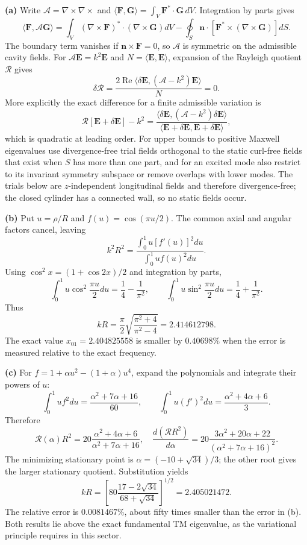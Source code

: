 \textbf{(a)} Write $\mathcal A=\nabla\times\nabla\times$ and
$\langle\mathbf F,\mathbf G\rangle=\int_V\mathbf F^*\cdot\mathbf G\,dV$.
Integration by parts gives
\[
\langle\mathbf F,\mathcal A\mathbf G\rangle
=\int_V(\nabla\times\mathbf F)^*\cdot(\nabla\times\mathbf G)dV
-\oint_S\mathbf n\cdot[\mathbf F^*\times(\nabla\times\mathbf G)]dS.
\]
The boundary term vanishes if $\mathbf n\times\mathbf F=0$,
so $\mathcal A$ is symmetric on the admissible cavity fields.
For $\mathcal A\mathbf E=k^2\mathbf E$ and
$N=\langle\mathbf E,\mathbf E\rangle$, expansion of the Rayleigh
quotient $\mathcal R$ gives
\[
\delta\mathcal R=\frac{2\operatorname{Re}
\langle\delta\mathbf E,(\mathcal A-k^2)\mathbf E\rangle}{N}=0.
\]
More explicitly the exact difference for a finite admissible variation is
\[
\mathcal R[\mathbf E+\delta\mathbf E]-k^2
=\frac{\langle\delta\mathbf E,(\mathcal A-k^2)\delta\mathbf E\rangle}
{\langle\mathbf E+\delta\mathbf E,\mathbf E+\delta\mathbf E\rangle},
\]
which is quadratic at leading order.  For upper bounds to positive
Maxwell eigenvalues use divergence-free trial fields orthogonal to
the static curl-free fields that exist when $S$ has more than one
part, and for an
excited mode also restrict to its invariant symmetry subspace or
remove overlaps with lower modes.  The trials below are
$z$-independent longitudinal fields and therefore divergence-free;
the closed cylinder has a connected wall, so no static fields occur.

\textbf{(b)} Put $u=\rho/R$ and $f(u)=\cos(\pi u/2)$.
The common axial and angular factors cancel, leaving
\[
k^2R^2=\frac{\int_0^1u[f'(u)]^2du}{\int_0^1uf(u)^2du}.
\]
Using $\cos^2x=(1+\cos2x)/2$ and integration by parts,
\[
\int_0^1u\cos^2\frac{\pi u}2du=\frac14-\frac1{\pi^2},\qquad
\int_0^1u\sin^2\frac{\pi u}2du=\frac14+\frac1{\pi^2}.
\]
Thus
\[
kR=\frac\pi2\sqrt{\frac{\pi^2+4}{\pi^2-4}}
=2.414612798.
\]
The exact value $x_{01}=2.404825558$ is smaller by $0.40698\%$
when the error is measured relative to the exact frequency.

\textbf{(c)} For $f=1+\alpha u^2-(1+\alpha)u^4$, expand the
polynomials and integrate their powers of $u$:
\[
\int_0^1uf^2du=\frac{\alpha^2+7\alpha+16}{60},\qquad
\int_0^1u(f')^2du=\frac{\alpha^2+4\alpha+6}{3}.
\]
Therefore
\[
\mathcal R(\alpha)R^2=20\frac{\alpha^2+4\alpha+6}{\alpha^2+7\alpha+16},
\quad
\frac{d(\mathcal RR^2)}{d\alpha}
=20\frac{3\alpha^2+20\alpha+22}{(\alpha^2+7\alpha+16)^2}.
\]
The minimizing stationary point is
$\alpha=(-10+\sqrt{34})/3$; the other root gives the larger
stationary quotient.  Substitution yields
\[
\boxed{kR=\left[80\frac{17-2\sqrt{34}}{68+\sqrt{34}}\right]^{1/2}
=2.405021472.}
\]
The relative error is $0.0081467\%$, about fifty times smaller
than the error in (b).  Both results lie above the exact fundamental
TM eigenvalue, as the variational principle requires in this sector.

